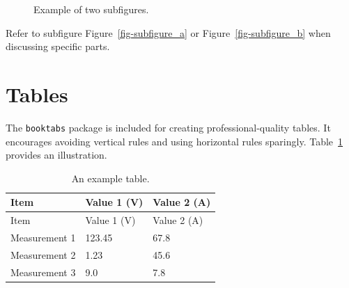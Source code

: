 \documentclass{article}
\begin{document}
\begin{figure}

\begin{minipage}{0.50\linewidth}



\end{minipage}%
%
\begin{minipage}{0.50\linewidth}



\end{minipage}%

\caption{\label{fig-subfigures_example}Example of two subfigures.}

\end{figure}%

Refer to subfigure Figure~\ref{fig-subfigure_a} or
Figure~\ref{fig-subfigure_b} when discussing specific parts.

\section{Tables}\label{sec-tables}

The \texttt{booktabs} package is included for creating
professional-quality tables. It encourages avoiding vertical rules and
using horizontal rules sparingly. Table~\ref{tbl-example_table} provides
an illustration.

\begin{longtable}[]{@{}lll@{}}
\caption{An example table.}\label{tbl-example_table}\tabularnewline
\toprule\noalign{}
Item & Value 1 (V) & Value 2 (A) \\
\midrule\noalign{}
\endfirsthead
\toprule\noalign{}
Item & Value 1 (V) & Value 2 (A) \\
\midrule\noalign{}
\endhead
\bottomrule\noalign{}
\endlastfoot
Measurement 1 & 123.45 & 67.8 \\
Measurement 2 & 1.23 & 45.6 \\
Measurement 3 & 9.0 & 7.8 \\
\end{longtable}
\end{document}
